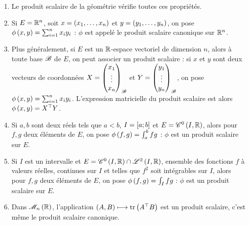 \begin{enumerate}
    \item Le produit scalaire de la géométrie vérifie toutes ces propriétés. \\
    \item Si \(E=\mathbb{R}^n\), soit \(x=\left(x_1,\dots,x_n\right)\) et \(y=\left(y_1,\dots,y_n\right)\), on pose \(\phi\left(x,y\right)=\sum_{i=1}^nx_iy_i\) : \(\phi\) est appelé le produit scalaire canonique sur \(\mathbb{R}^n\). \\
    \item Plus généralement, si \(E\) est un \(\mathbb{R}\)-espace vectoriel de dimension \(n\), alors à toute base \(\mathscr{B}\) de \(E\), on peut associer un produit scalaire : si \(x\) et \(y\) sont deux vecteurs de coordonnées \(X=\begin{pmatrix}x_1\\\vdots\\x_n\end{pmatrix}_{\mathscr{B}}\) et \(Y=\begin{pmatrix}y_1\\\vdots\\y_n\end{pmatrix}_{\mathscr{B}}\), on pose \(\phi\left(x,y\right)=\sum_{i=1}^nx_iy_i\). L'expression matricielle du produit scalaire est alors \(\phi\left(x,y\right)=X^{\top}Y\). \\
    \item Si \(a,b\) sont deux réels tels que \(a<b\), \(I=\left[a;b\right]\) et \(E=\mathscr{C}^{0}\left(I,\mathbb{R}\right)\), alors pour \(f,g\) deux éléments de \(E\), on pose \(\phi\left(f,g\right)=\int_a^bfg\) : \(\phi\) est un produit scalaire sur \(E\). \\
    \item Si \(I\) est un intervalle et \(E=\ensclasse{0}{I}{\R}\inter\integ{2}{I}{\R}\), ensemble des fonctions \(f\) à valeurs réelles, continues sur \(I\) et telles que \(f^2\) soit intégrables sur \(I\), alors pour \(f,g\) deux éléments de \(E\), on pose \(\phi\left(f,g\right)=\int_Ifg\) : \(\phi\) est un produit scalaire sur \(E\). \\
    \item Dans \(\M{n}[\R]\), l'application \(\left(A,B\right)\longmapsto\operatorname{tr}\left(A^{\top}B\right)\) est un produit scalaire, c'est même le produit scalaire canonique.
\end{enumerate}

